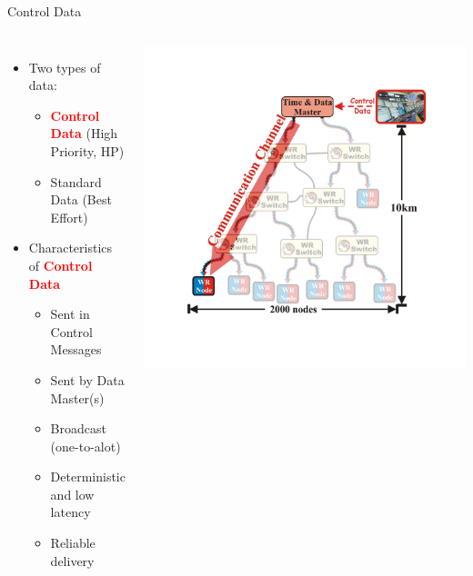 \documentclass[compress,red]{beamer}
\begin{document}
\begin{frame}{Control Data}

\begin{columns}[c]
    \begin{itemize}
      \item Two types of data:
	  \begin{itemize}
	    \item \textcolor{red}{\bf Control Data} (High Priority, HP)
	    \item Standard Data (Best Effort)
	  \end{itemize}
	  \item Characteristics of \textcolor{red}{\bf Control Data}
	  \begin{itemize}
	    \item Sent in Control Messages
	    \item Sent by Data Master(s)
	    \item Broadcast (one-to-alot)
	    \item Deterministic and low latency
	    \item Reliable delivery
	  \end{itemize}
    \end{itemize}
    \begin{center}
    \includegraphics[height=0.8\textheight]{robustness/communication_channel-pro}

\end{center}
\end{columns}
\end{frame}
\end{document}
